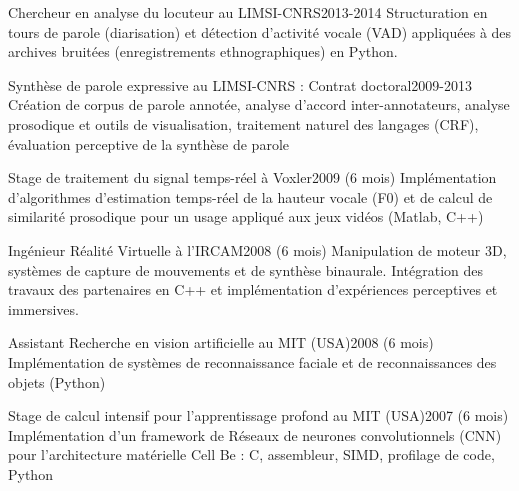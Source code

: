\begin{fr}
\begin{jobshort}{Chercheur en analyse du locuteur au LIMSI-CNRS}{2013-2014}
Structuration en tours de parole (diarisation) et détection d'activité vocale (VAD) appliquées à des archives bruitées (enregistrements ethnographiques) en Python.
\end{jobshort}



\begin{jobshort}{Synthèse de parole expressive au LIMSI-CNRS : Contrat doctoral}{2009-2013}
Création de corpus de parole annotée, analyse d'accord inter-annotateurs, analyse prosodique et outils de visualisation, traitement naturel des langages (CRF), évaluation perceptive de la synthèse de parole
\end{jobshort}



\begin{jobshort}{Stage de traitement du signal temps-réel à Voxler}{2009 (6 mois)}
Implémentation d'algorithmes d'estimation temps-réel de la hauteur vocale (F0) et de calcul de similarité prosodique pour un usage appliqué aux jeux vidéos (Matlab, C++)
\end{jobshort}

\begin{jobshort}{Ingénieur Réalité Virtuelle à l'IRCAM}{2008 (6 mois)}
Manipulation de moteur 3D, systèmes de capture de mouvements et de synthèse binaurale. Intégration des travaux des partenaires en C++ et implémentation d'expériences perceptives et immersives.
\end{jobshort}

\begin{jobshort}{Assistant Recherche en vision artificielle au MIT (USA)}{2008 (6 mois)}
Implémentation de systèmes de reconnaissance faciale et de reconnaissances des objets (Python)
\end{jobshort}

\begin{jobshort}{Stage de calcul intensif pour l'apprentissage profond au MIT (USA)}{2007 (6 mois)}
Implémentation d'un framework de Réseaux de neurones convolutionnels (CNN) pour l'architecture matérielle Cell Be : C, assembleur, SIMD, profilage de code, Python
\end{jobshort}
\end{fr}



